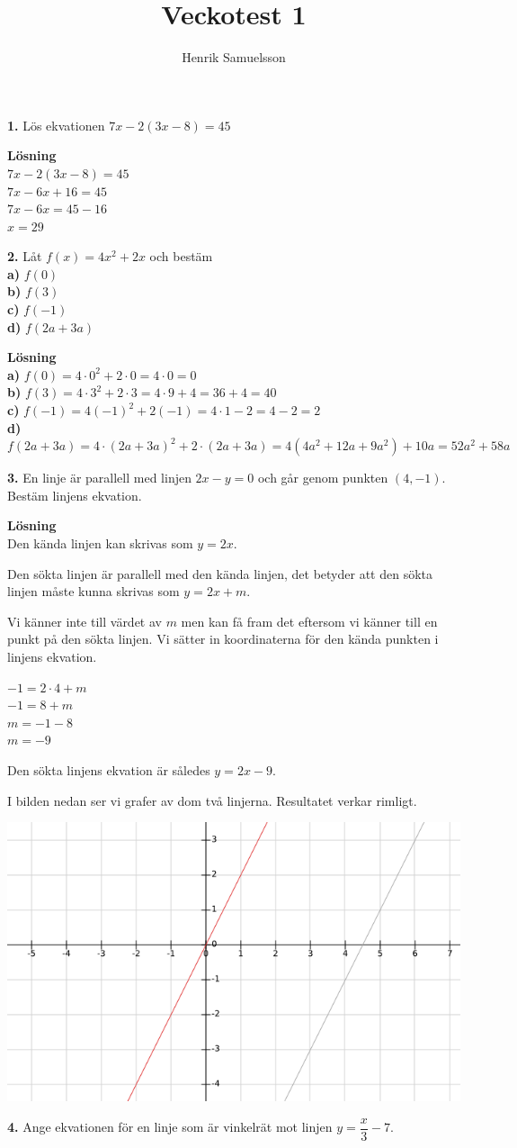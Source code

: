 \documentclass{article}
\begin{document}
\title{Veckotest 1}
\author{Henrik Samuelsson}
\maketitle
\textbf{1.} Lös ekvationen $7x-2(3x-8)=45$

\textbf{Lösning}\\
$7x-2(3x-8)=45$\\
$7x-6x+16=45$\\
$7x-6x=45-16$\\
$x=29$

\textbf{2.} Låt $f(x)=4x^{2}+2x$ och bestäm\\
\textbf{a)} $f(0)$\\
\textbf{b)} $f(3)$\\
\textbf{c)} $f(-1)$\\
\textbf{d)} $f(2a + 3a)$

\textbf{Lösning}\\
\textbf{a)} $f(0)=4\cdot0^2+2\cdot0=4\cdot0=0$\\
\textbf{b)} $f(3)=4\cdot3^2+2\cdot3=4\cdot9+4=36+4=40$\\
\textbf{c)} $f(-1)=4(-1)^2+2(-1)=4\cdot1-2=4-2=2$\\
\textbf{d)} $f(2a+3a)=4\cdot(2a+3a)^2+2\cdot(2a+3a)=4(4a^2+12a+9a^2)+10a=52a^2+58a$

\textbf{3.} En linje är parallell med linjen $2x - y = 0$ och går genom punkten $(4, -1)$. Bestäm linjens ekvation.

\textbf{Lösning}\\
Den kända linjen kan skrivas som $y = 2x$.

Den sökta linjen är parallell med den kända linjen, det betyder att den sökta linjen måste kunna skrivas som $y = 2x + m$.

Vi känner inte till värdet av $m$ men kan få fram det eftersom vi känner till en punkt på den sökta linjen. Vi sätter in koordinaterna för den kända punkten i linjens ekvation.

$-1 = 2 \cdot 4 + m$\\
$-1 = 8 + m$\\
$m = -1 - 8$\\
$m = -9$

Den sökta linjens ekvation är således $y = 2x - 9$.

I bilden nedan ser vi grafer av dom två linjerna. Resultatet verkar rimligt. 

\includegraphics[scale=0.65]{graph_1_3_1.png} 

\textbf{4.} Ange ekvationen för en linje som är vinkelrät mot linjen $y=\dfrac{x}{3}-7$.
\end{document}
